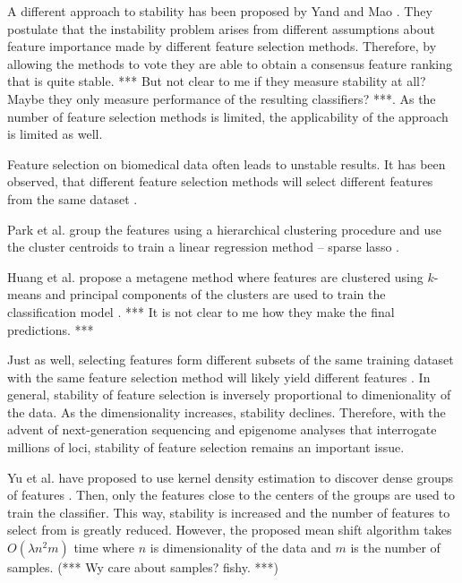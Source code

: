 \documentclass{llncs}
\newcommand{\jg}[1]{{\color{red}*** #1 ***}}
\begin{document}
A different approach to stability has been proposed by Yand and Mao \cite{yang2011robust}. They postulate that the instability problem arises from different assumptions about feature importance made by different feature selection methods. Therefore, by allowing the methods to vote they are able to obtain a consensus feature ranking that is quite stable. \jg{But not clear to me if they measure stability at all? Maybe they only measure performance of the resulting classifiers?}. As the number of feature selection methods is limited, the applicability of the approach is limited as well. 


Feature selection on biomedical data often leads to unstable results. It has
been observed, that different feature selection methods will select different
features from the same dataset \cite{yang2011robust}. 



Park et al. group the features using a hierarchical clustering procedure and use the cluster centroids to train a linear regression method -- sparse lasso \cite{park2007averaged}. 

Huang et al. propose a metagene method where features are clustered using $k$-means and principal components of the clusters are used to train the classification model \cite{huang2003gene,huang2003expression}. \jg{It is not clear to me how they make the final predictions.}


Just as well, selecting
features form different subsets of the same training dataset with the same
feature selection method will likely yield different features
\cite{loscalzo2009consensus}. In general, stability of feature selection is
inversely proportional to dimenionality of the data. As the dimensionality
increases, stability declines. Therefore, with the advent of next-generation
sequencing and epigenome analyses that interrogate millions of loci, stability
of feature selection remains an important issue.


Yu et al. have proposed to use kernel density estimation to discover dense groups of features \cite{yu2008stable}. Then, only the features close to the centers of the groups are used to train the classifier. This way, stability is increased and the number of features to select from is greatly reduced. However, the proposed mean shift algorithm takes $O(\lambda
n^2 m)$ time where $n$ is dimensionality of the data and $m$ is the number of samples. (\jg{Wy care about samples? fishy.})
\end{document}
